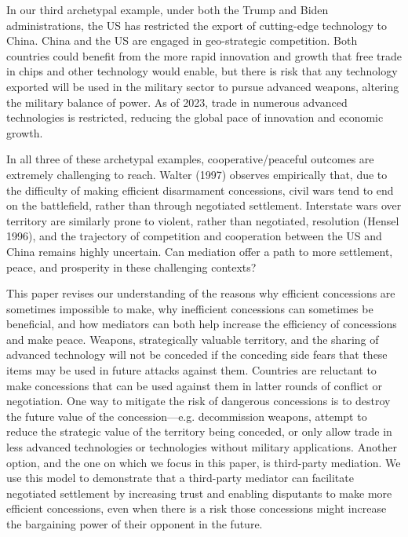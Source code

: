 \documentclass[12pt, letterpaper]{article}
\begin{document}
In our third archetypal example, under both the Trump and Biden administrations, the US has restricted the export of cutting-edge technology to China. China and the US are engaged in geo-strategic competition. Both countries could benefit from the more rapid innovation and growth that free trade in chips and other technology would enable, but there is risk that any technology exported will be used in the military sector to pursue advanced weapons, altering the military balance of power. As of 2023, trade in numerous advanced technologies is restricted, reducing the global pace of innovation and economic growth. 

In all three of these archetypal examples, cooperative/peaceful outcomes are extremely challenging to reach. Walter (1997) observes empirically that, due to the difficulty of making efficient disarmament concessions, civil wars tend to end on the battlefield, rather than through negotiated settlement. Interstate wars over territory are similarly prone to violent, rather than negotiated, resolution (Hensel 1996), and the trajectory of competition and cooperation between the US and China remains highly uncertain. Can mediation offer a path to more settlement, peace, and prosperity in these challenging contexts? 

This paper revises our understanding of the reasons why efficient concessions are sometimes impossible to make, why inefficient concessions can sometimes be beneficial, and how mediators can both help increase the efficiency of concessions and make peace. Weapons, strategically valuable territory, and the sharing of advanced technology will not be conceded if the conceding side fears that these items may be used in future attacks against them. Countries are reluctant to make concessions that can be used against them in latter rounds of conflict or negotiation. One way to mitigate the risk of dangerous concessions is to destroy the future value of the concession---e.g. decommission weapons, attempt to reduce the strategic value of the territory being conceded, or only allow trade in less advanced technologies or technologies without military applications. Another option, and the one on which we focus in this paper, is third-party mediation. We use this model to demonstrate that a third-party mediator can facilitate negotiated settlement by increasing trust and enabling disputants to make more efficient concessions, even when there is a risk those concessions might increase the bargaining power of their opponent in the future. 
\end{document}
